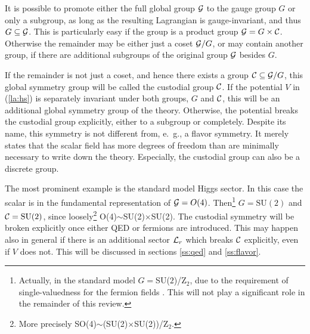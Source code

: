 \documentclass[final,12pt]{article}
\newcommand*{\La}{{\cal{L}}}
\newcommand*{\pref}[1]{(\ref{#1})}
\newcommand*{\1}{1\!\!\!\bot}
\begin{document}
It is possible to promote either the full global group ${\cal G}$ to the gauge group $G$ or only a subgroup, as long as the resulting Lagrangian is gauge-invariant, and thus $G\subseteq{\cal G}$. This is particularly easy if the group is a product group ${\cal G}=G\times{\cal C}$. Otherwise the remainder may be either just a coset ${\cal G}/G$, or may contain another group, if there are additional subgroups of the original group ${\cal G}$ besides $G$.

If the remainder is not just a coset, and hence there exists a group ${\cal C}\subseteq{\cal G}/G$, this global symmetry group will be called the custodial group ${\cal C}$. If the potential $V$ in \pref{la:hs} is separately invariant under both groups, $G$ and ${\cal C}$, this will be an additional global symmetry group of the theory. Otherwise, the potential breaks the custodial group explicitly, either to a subgroup or completely. Despite its name, this symmetry is not different from, e.\ g., a flavor symmetry. It merely states that the scalar field has more degrees of freedom than are minimally necessary to write down the theory. Especially, the custodial group can also be a discrete group.

The most prominent example is the standard model Higgs sector. In this case the scalar is in the fundamental representation of ${\cal G}=O(4)$. Then\footnote{Actually, in the standard model $G=$SU($2$)/Z$_2$, due to the requirement of single-valuedness for the fermion fields \cite{O'Raifeartaigh:1986vq}. This will not play a significant role in the remainder of this review.} $G=\text{SU}(2)$ and ${\cal C}=\text{SU}(2)$, since loosely\footnote{More precisely SO(4)$\sim$(SU(2)$\times$SU(2))/Z$_2$.} O(4)$\sim$SU(2)$\times$SU(2). The custodial symmetry will be broken explicitly once either QED or fermions are introduced. This may happen also in general if there is an additional sector $\La_r$ which breaks ${\cal C}$ explicitly, even if $V$ does not. This will be discussed in sections \ref{ss:qed} and \ref{ss:flavor}.
\end{document}
